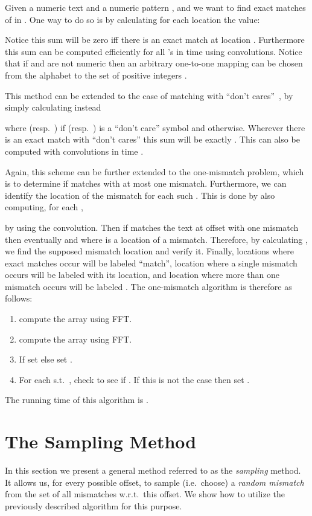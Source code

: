 \documentclass[11pt]{article}
\begin{document}
Given a numeric text  and a numeric pattern , and we want to
find exact matches of  in . One way to do so is by
calculating for each location  the value:

Notice this sum will be zero iff there is an exact match at location
. Furthermore this sum can be computed efficiently for all 's
in  time using convolutions.  Notice that if 
and  are not numeric then an arbitrary one-to-one mapping can be
chosen from the alphabet to the set of positive integers
.

This method can be extended to the case of matching with ``don't
cares''~\cite{CC07}, by simply calculating instead

where  (resp.\ ) if  (resp.\ ) is a ``don't
care'' symbol and  otherwise. Wherever there is an exact match with
``don't cares'' this sum will be exactly . This can also be computed
with convolutions in time .

Again, this scheme can be further extended to the one-mismatch
problem, which is to determine if  matches 
with at most one mismatch. Furthermore, we can identify the location
of the mismatch for each such . This is done by also computing,
for each ,

by using the convolution. Then if  matches the text at offset
 with one mismatch then eventually  and
 where  is a location of a mismatch.
Therefore, by calculating , we find the supposed
mismatch location and verify it. Finally, locations where exact
matches occur will be labeled ``match'', location where a single
mismatch occurs will be labeled with its location, and location
where more than one mismatch occurs will be labeled . The
one-mismatch algorithm is therefore as follows:
\begin{enumerate}
    \item compute the array      using FFT.
    \item  compute the array  using FFT.
    \item  If  set  else set
    .
    \item For each  s.t.\ , check to see if
    . If this is not the case then
    set .
\end{enumerate}
The running time of this algorithm is .

\section{The Sampling Method}\label{s:naive}
In this section we present a general method referred to as the
\emph{sampling} method. It allows us, for every possible offset,
to sample (i.e.\ choose) a {\em random mismatch} from the set of all
mismatches w.r.t.\ this offset.
We show how to utilize the previously described algorithm for this
purpose.
\end{document}
